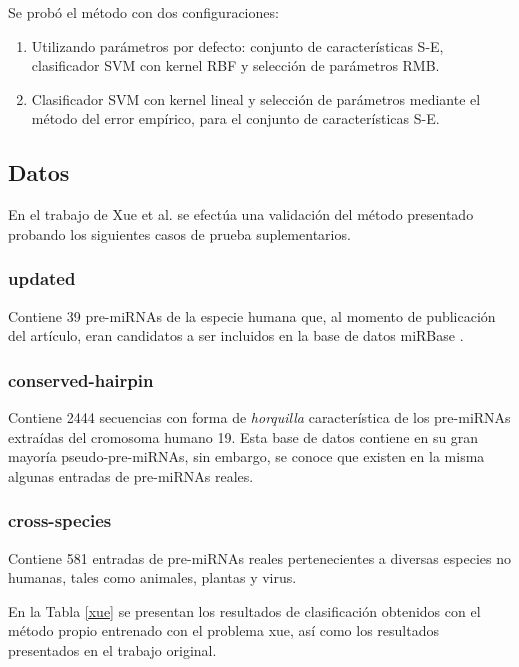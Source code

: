 \documentclass[12pt,bibliography=oldstyle,DIV=12,parskip=half-]{scrreprt}
\begin{document}
Se probó el método con dos configuraciones:
\begin{enumerate}
\item Utilizando parámetros por defecto: conjunto de características S-E,
  clasificador SVM con kernel RBF y selección de parámetros RMB.
\item Clasificador SVM con kernel lineal y selección de parámetros
  mediante el método del error empírico, para el conjunto de
  características S-E.
\end{enumerate}
%
%
%
\subsection{Datos}
%
En el trabajo de Xue et al. \cite{xue} se efectúa una validación del
método presentado probando los siguientes casos de prueba
suplementarios.
%
\subsubsection{updated}
%
Contiene 39 pre-miRNAs de la especie humana que, al momento de
publicación del artículo, eran candidatos a ser incluidos en la base
de datos miRBase \cite{mirbase3}.
%
\subsubsection{conserved-hairpin}
%
Contiene 2444 secuencias con forma de \emph{horquilla} característica
de los pre-miRNAs extraídas del cromosoma humano 19. Esta base de
datos contiene en su gran mayoría pseudo-pre-miRNAs, sin embargo, se
conoce que existen en la misma algunas entradas de pre-miRNAs reales.
%
\subsubsection{cross-species}
%
Contiene 581 entradas de pre-miRNAs reales pertenecientes a diversas
especies no humanas, tales como animales, plantas y virus.

En la Tabla \autoref{xue} se presentan los resultados de clasificación
obtenidos con el método propio entrenado con el problema xue, así como
los resultados presentados en el trabajo original.

%
\end{document}
